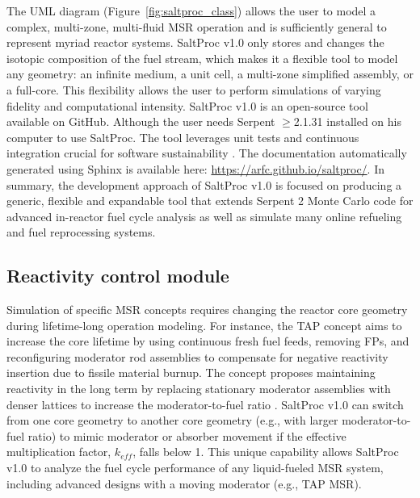 The UML diagram (Figure~\ref{fig:saltproc_class}) allows the user to model a 
complex, multi-zone, multi-fluid \gls{MSR} operation and is sufficiently 
general to represent myriad reactor systems. SaltProc v1.0 only stores and 
changes the isotopic composition of the fuel stream, which makes it a flexible 
tool to model any geometry: an infinite medium, a unit cell, a multi-zone 
simplified assembly, or a full-core. This flexibility allows the user to 
perform simulations of varying fidelity and computational intensity. 
SaltProc v1.0 is an open-source tool available on GitHub. Although the user 
needs Serpent $\geq$2.1.31 installed on his computer to use SaltProc. The tool 
leverages unit tests and continuous integration crucial for software 
sustainability \cite{krekel_pytest_2004, travis_travis-ci/travis-api_2016}. 
The documentation automatically generated using Sphinx 
\cite{brandl_sphinx:_2009} is available here: 
\url{https://arfc.github.io/saltproc/}. In summary, the 
development approach of SaltProc v1.0 is focused on producing a generic, 
flexible and expandable tool that extends Serpent 2 Monte Carlo code for 
advanced in-reactor fuel cycle analysis as well as simulate many online 
refueling and fuel reprocessing systems.

\subsection{Reactivity control module}
Simulation of specific \gls{MSR} concepts requires changing the reactor core 
geometry during lifetime-long operation modeling. For instance, the \gls{TAP} 
concept aims to increase the core lifetime by using continuous fresh fuel 
feeds, removing \glspl{FP}, and reconfiguring moderator rod assemblies to 
compensate for negative reactivity insertion due to fissile material burnup. 
The concept proposes maintaining reactivity in the long term by replacing 
stationary moderator assemblies with denser lattices to increase the 
moderator-to-fuel ratio \cite{betzler_assessment_2017-1}. 
SaltProc v1.0 can switch from one core geometry to another core geometry  
(e.g., with larger moderator-to-fuel ratio) to mimic moderator or absorber 
movement if the effective multiplication factor, $k_{eff}$, falls below 1. 
This unique capability allows SaltProc v1.0 to 
analyze the fuel cycle performance of any liquid-fueled \gls{MSR} system, 
including advanced designs with a moving moderator (e.g., \gls{TAP} \gls{MSR}).

